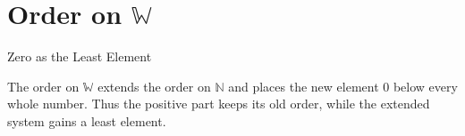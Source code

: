 
\section{Order on \texorpdfstring{$\mathbb{W}$}{W}}
\label{sec:order-on-w}
\begin{topicbox}{Zero as the Least Element}
\begin{exposition}
The order on $\mathbb{W}$ extends the order on $\mathbb{N}$ and places the
new element $0$ below every whole number. Thus the positive part keeps its
old order, while the extended system gains a least element.
\end{exposition}
\end{topicbox}
